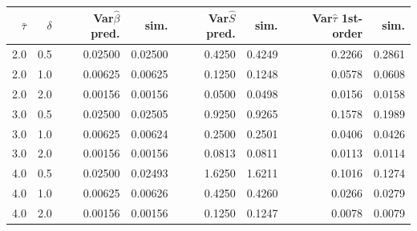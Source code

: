 \begin{tabular}{rrrrrrrr}
\toprule
$\bar\tau$ & $\delta$ & Var$\hat\beta$ pred. & sim. & Var$\hat S$ pred. & sim. & Var$\hat\tau$ 1st-order & sim. \\
\midrule
2.0 & 0.5 & 0.02500 & 0.02500 & 0.4250 & 0.4249 & 0.2266 & 0.2861 \\
2.0 & 1.0 & 0.00625 & 0.00625 & 0.1250 & 0.1248 & 0.0578 & 0.0608 \\
2.0 & 2.0 & 0.00156 & 0.00156 & 0.0500 & 0.0498 & 0.0156 & 0.0158 \\
3.0 & 0.5 & 0.02500 & 0.02505 & 0.9250 & 0.9265 & 0.1578 & 0.1989 \\
3.0 & 1.0 & 0.00625 & 0.00624 & 0.2500 & 0.2501 & 0.0406 & 0.0426 \\
3.0 & 2.0 & 0.00156 & 0.00156 & 0.0813 & 0.0811 & 0.0113 & 0.0114 \\
4.0 & 0.5 & 0.02500 & 0.02493 & 1.6250 & 1.6211 & 0.1016 & 0.1274 \\
4.0 & 1.0 & 0.00625 & 0.00626 & 0.4250 & 0.4260 & 0.0266 & 0.0279 \\
4.0 & 2.0 & 0.00156 & 0.00156 & 0.1250 & 0.1247 & 0.0078 & 0.0079 \\
\bottomrule
\end{tabular}
